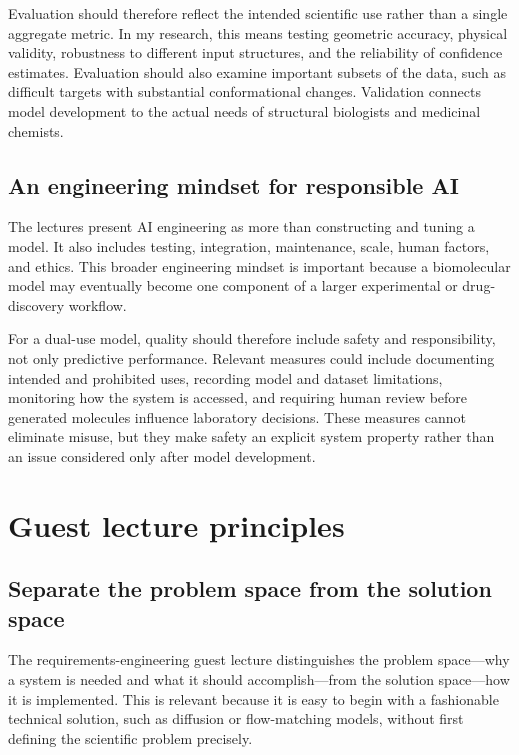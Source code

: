 \documentclass[a4paper,11pt]{article}
\begin{document}
Evaluation should therefore reflect the intended scientific use rather than a single aggregate metric. In my research, this means testing geometric accuracy, physical validity, robustness to different input structures, and the reliability of confidence estimates. Evaluation should also examine important subsets of the data, such as difficult targets with substantial conformational changes. Validation connects model development to the actual needs of structural biologists and medicinal chemists.

\subsection{An engineering mindset for responsible AI}

The lectures present AI engineering as more than constructing and tuning a model. It also includes testing, integration, maintenance, scale, human factors, and ethics. This broader engineering mindset is important because a biomolecular model may eventually become one component of a larger experimental or drug-discovery workflow.

For a dual-use model, quality should therefore include safety and responsibility, not only predictive performance. Relevant measures could include documenting intended and prohibited uses, recording model and dataset limitations, monitoring how the system is accessed, and requiring human review before generated molecules influence laboratory decisions. These measures cannot eliminate misuse, but they make safety an explicit system property rather than an issue considered only after model development.

\section{Guest lecture principles}

\subsection{Separate the problem space from the solution space}

The requirements-engineering guest lecture distinguishes the problem space---why a system is needed and what it should accomplish---from the solution space---how it is implemented. This is relevant because it is easy to begin with a fashionable technical solution, such as diffusion or flow-matching models, without first defining the scientific problem precisely.
\end{document}
